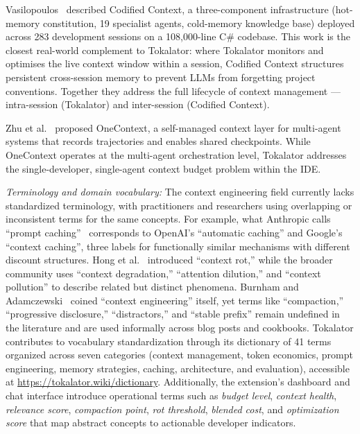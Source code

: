 \documentclass[a4paper,fleqn]{cas-dc}
\begin{document}
Vasilopoulos~\cite{vasilopoulos2026codified} described Codified Context, a three-component infrastructure (hot-memory constitution, 19 specialist agents, cold-memory knowledge base) deployed across 283 development sessions on a 108,000-line C\# codebase. This work is the closest real-world complement to Tokalator: where Tokalator monitors and optimises the live context window within a session, Codified Context structures persistent cross-session memory to prevent LLMs from forgetting project conventions. Together they address the full lifecycle of context management — intra-session (Tokalator) and inter-session (Codified Context).

Zhu et al.~\cite{zhu2025onecontext} proposed OneContext, a self-managed context layer for multi-agent systems that records trajectories and enables shared checkpoints. While OneContext operates at the multi-agent orchestration level, Tokalator addresses the single-developer, single-agent context budget problem within the IDE.

\textit{Terminology and domain vocabulary:}
The context engineering field currently lacks standardized terminology, with practitioners and researchers using overlapping or inconsistent terms for the same concepts. For example, what Anthropic calls ``prompt caching''~\cite{anthropic2025caching} corresponds to OpenAI's ``automatic caching'' and Google's ``context caching'', three labels for functionally similar mechanisms with different discount structures. Hong et al.~\cite{hong2025contextrot} introduced ``context rot,'' while the broader community uses ``context degradation,'' ``attention dilution,'' and ``context pollution'' to describe related but distinct phenomena. Burnham and Adamczewski~\cite{burnham2025context} coined ``context engineering'' itself, yet terms like ``compaction,'' ``progressive disclosure,'' ``distractors,'' and ``stable prefix'' remain undefined in the literature and are used informally across blog posts and cookbooks. Tokalator contributes to vocabulary standardization through its dictionary of 41 terms organized across seven categories (context management, token economics, prompt engineering, memory strategies, caching, architecture, and evaluation), accessible at \url{https://tokalator.wiki/dictionary}. Additionally, the extension's dashboard and chat interface introduce operational terms such as \emph{budget level}, \emph{context health}, \emph{relevance score}, \emph{compaction point}, \emph{rot threshold}, \emph{blended cost}, and \emph{optimization score} that map abstract concepts to actionable developer indicators. 
\end{document}
